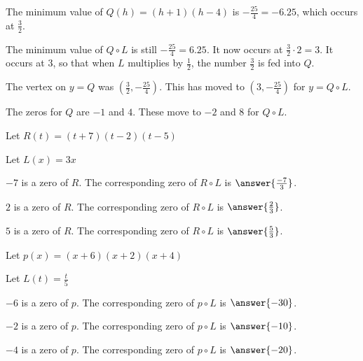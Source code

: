 \documentclass{ximera}
\begin{document}
The minimum value of $Q(h) = (h+1)(h-4)$ is $-\frac{25}{4} = -6.25$, which occurs at $\frac{3}{2}$. 

The minimum value of $Q \circ L$ is still $-\frac{25}{4} = 6.25$. It now occurs at $\frac{3}{2} \cdot 2 = 3$.  It occurs at $3$, so that when $L$ multiplies by $\frac{1}{2}$, the number $\frac{3}{2}$ is fed into $Q$. 


The vertex on $y = Q$ was $\left (\frac{3}{2}, -\frac{25}{4} \right)$. This has moved to $\left (3, -\frac{25}{4} \right)$ for $y = Q \circ L$.


The zeros for $Q$ are $-1$ and $4$.  These move to $-2$ and $8$ for $Q \circ L$.  




\begin{question} 


Let $R(t) = (t+7)(t-2)(t-5)$ 

Let $L(x) = 3x$ 


$-7$ is a zero of $R$.  The corresponding zero of $R \circ L$ is $\answer{\frac{-7}{3}}$.

$2$ is a zero of $R$.  The corresponding zero of $R \circ L$ is $\answer{\frac{2}{3}}$.

$5$ is a zero of $R$.  The corresponding zero of $R \circ L$ is $\answer{\frac{5}{3}}$.


\end{question}












\begin{question} 


Let $p(x) = (x+6)(x+2)(x+4)$ 

Let $L(t) = \frac{t}{5}$ 


$-6$ is a zero of $p$.  The corresponding zero of $p \circ L$ is $\answer{-30}$.

$-2$ is a zero of $p$.  The corresponding zero of $p \circ L$ is $\answer{-10}$.

$-4$ is a zero of $p$.  The corresponding zero of $p \circ L$ is $\answer{-20}$.


\end{question}
\end{document}
